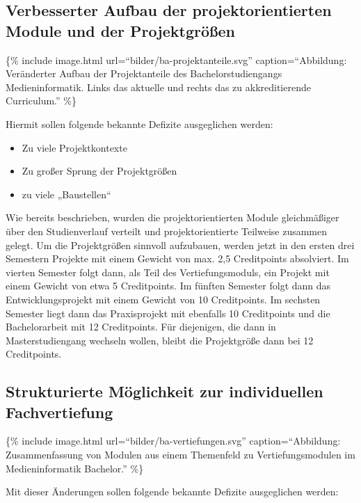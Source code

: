 \subsection{Verbesserter Aufbau der projektorientierten Module und
der
Projektgrößen}\label{verbesserter-aufbau-der-projektorientierten-module-und-der-projektgruxf6uxdfen}

\{\% include image.html url=``bilder/ba-projektanteile.svg''
caption=``Abbildung: Veränderter Aufbau der Projektanteile des
Bachelorstudiengangs Medieninformatik. Links das aktuelle und rechts das
zu akkreditierende Curriculum.'' \%\}

Hiermit sollen folgende bekannte Defizite ausgeglichen werden:

\begin{itemize}
\tightlist
\item
  Zu viele Projektkontexte
\item
  Zu großer Sprung der Projektgrößen
\item
  zu viele „Baustellen``
\end{itemize}

Wie bereits beschrieben, wurden die projektorientierten Module
gleichmäßiger über den Studienverlauf verteilt und projektorientierte
Teilweise zusammen gelegt. Um die Projektgrößen sinnvoll aufzubauen,
werden jetzt in den ersten drei Semestern Projekte mit einem Gewicht von
max. 2,5 Creditpoints absolviert. Im vierten Semester folgt dann, als
Teil des Vertiefungsmoduls, ein Projekt mit einem Gewicht von etwa 5
Creditpoints. Im fünften Semester folgt dann das Entwicklungsprojekt mit
einem Gewicht von 10 Creditpoints. Im sechsten Semester liegt dann das
Praxisprojekt mit ebenfalls 10 Creditpoints und die Bachelorarbeit mit
12 Creditpoints. Für diejenigen, die dann in Masterstudiengang wechseln
wollen, bleibt die Projektgröße dann bei 12 Creditpoints.

\subsection{Strukturierte Möglichkeit zur individuellen
Fachvertiefung}\label{strukturierte-muxf6glichkeit-zur-individuellen-fachvertiefung}

\{\% include image.html url=``bilder/ba-vertiefungen.svg''
caption=``Abbildung: Zusammenfassung von Modulen aus einem Themenfeld zu
Vertiefungsmodulen im Medieninformatik Bachelor.'' \%\}

Mit dieser Änderungen sollen folgende bekannte Defizite ausgeglichen
werden:

